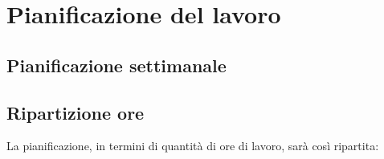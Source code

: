 \section*{Pianificazione del lavoro}

\subsection*{Pianificazione settimanale}
\prospettoSettimanale

\subsection*{Ripartizione ore}

La pianificazione, in termini di quantità di ore di lavoro, sarà così ripartita:

\begin{center}
    
\end{center}